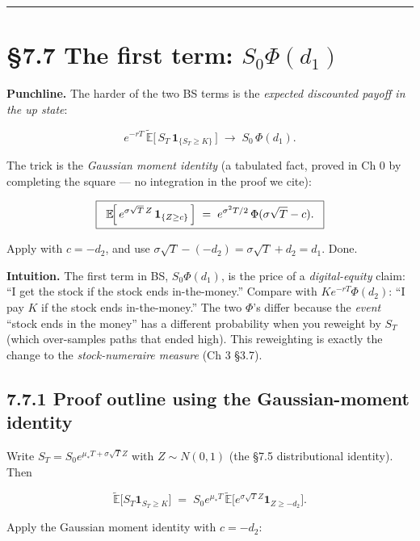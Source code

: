 \documentclass[
  10pt,
  twoside]{book}
\begin{document}
\begin{center}\rule{0.5\linewidth}{0.5pt}\end{center}

\section{\texorpdfstring{§7.7 The first term:
\(S_0\Phi(d_1)\)}{§7.7 The first term: S\_0\textbackslash Phi(d\_1)}}\label{the-first-term-s_0phid_1}

\textbf{Punchline.} The harder of the two BS terms is the \emph{expected
discounted payoff in the up state}:

\[e^{-rT}\,\tilde{\mathbb E}\bigl[\,S_T\,\mathbf 1_{\{S_T \ge K\}}\,\bigr] \;\to\; S_0\,\Phi(d_1).\]

The trick is the \emph{Gaussian moment identity} (a tabulated fact,
proved in Ch 0 by completing the square --- no integration in the proof
we cite):

\[\boxed{\;\; \mathbb E\!\Bigl[\,e^{\sigma\sqrt T\, Z}\,\mathbf 1_{\{Z \ge c\}}\,\Bigr] \;=\; e^{\sigma^2 T/2}\,\Phi(\sigma\sqrt T - c). \;\;}\]

Apply with \(c = -d_2\), and use
\(\sigma\sqrt T - (-d_2) = \sigma\sqrt T + d_2 = d_1\). Done.

\textbf{Intuition.} The first term in BS, \(S_0 \Phi(d_1)\), is the
price of a \emph{digital-equity} claim: ``I get the stock if the stock
ends in-the-money.'' Compare with \(K e^{-rT} \Phi(d_2)\): ``I pay \(K\)
if the stock ends in-the-money.'' The two \(\Phi\)'s differ because the
\emph{event} ``stock ends in the money'' has a different probability
when you reweight by \(S_T\) (which over-samples paths that ended high).
This reweighting is exactly the change to the \emph{stock-numeraire
measure} (Ch 3 §3.7).

\subsection{7.7.1 Proof outline using the Gaussian-moment
identity}\label{proof-outline-using-the-gaussian-moment-identity}

Write \(S_T = S_0 e^{\mu_* T + \sigma\sqrt T Z}\) with \(Z \sim N(0,1)\)
(the §7.5 distributional identity). Then

\[\tilde{\mathbb E}\bigl[S_T \mathbf 1_{S_T \ge K}\bigr] \;=\; S_0 e^{\mu_* T}\,\tilde{\mathbb E}\bigl[e^{\sigma\sqrt T Z}\mathbf 1_{Z \ge -d_2}\bigr].\]

Apply the Gaussian moment identity with \(c = -d_2\):
\end{document}
